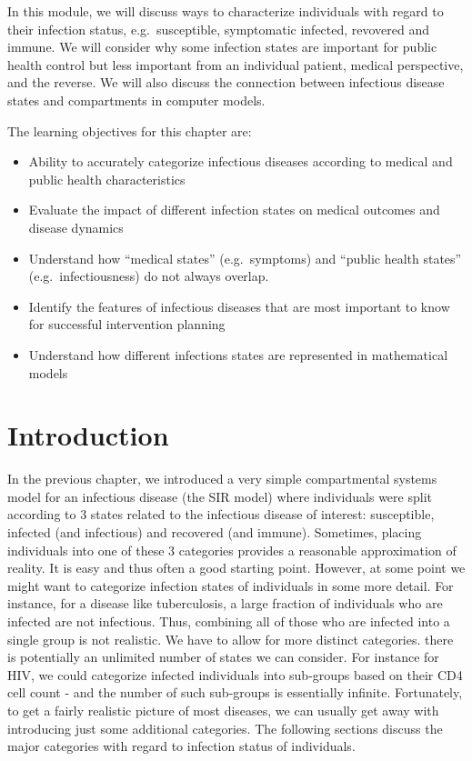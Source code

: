 \documentclass[]{book}
\providecommand{\tightlist}{%
  \setlength{\itemsep}{0pt}\setlength{\parskip}{0pt}}
\theoremstyle{definition}
\theoremstyle{definition}
\theoremstyle{definition}
\theoremstyle{remark}
\begin{document}
In this module, we will discuss ways to characterize individuals with
regard to their infection status, e.g.~susceptible, symptomatic
infected, revovered and immune. We will consider why some infection
states are important for public health control but less important from
an individual patient, medical perspective, and the reverse. We will
also discuss the connection between infectious disease states and
compartments in computer models.

The learning objectives for this chapter are:

\begin{itemize}
\tightlist
\item
  Ability to accurately categorize infectious diseases according to
  medical and public health characteristics
\item
  Evaluate the impact of different infection states on medical outcomes
  and disease dynamics
\item
  Understand how ``medical states'' (e.g.~symptoms) and ``public health
  states'' (e.g.~infectiousness) do not always overlap.
\item
  Identify the features of infectious diseases that are most important
  to know for successful intervention planning
\item
  Understand how different infections states are represented in
  mathematical models
\end{itemize}

\section{Introduction}\label{introduction-1}

In the previous chapter, we introduced a very simple compartmental
systems model for an infectious disease (the SIR model) where
individuals were split according to 3 states related to the infectious
disease of interest: susceptible, infected (and infectious) and
recovered (and immune). Sometimes, placing individuals into one of these
3 categories provides a reasonable approximation of reality. It is easy
and thus often a good starting point. However, at some point we might
want to categorize infection states of individuals in some more detail.
For instance, for a disease like tuberculosis, a large fraction of
individuals who are infected are not infectious. Thus, combining all of
those who are infected into a single group is not realistic. We have to
allow for more distinct categories. there is potentially an unlimited
number of states we can consider. For instance for HIV, we could
categorize infected individuals into sub-groups based on their CD4 cell
count - and the number of such sub-groups is essentially infinite.
Fortunately, to get a fairly realistic picture of most diseases, we can
usually get away with introducing just some additional categories. The
following sections discuss the major categories with regard to infection
status of individuals.
\end{document}
